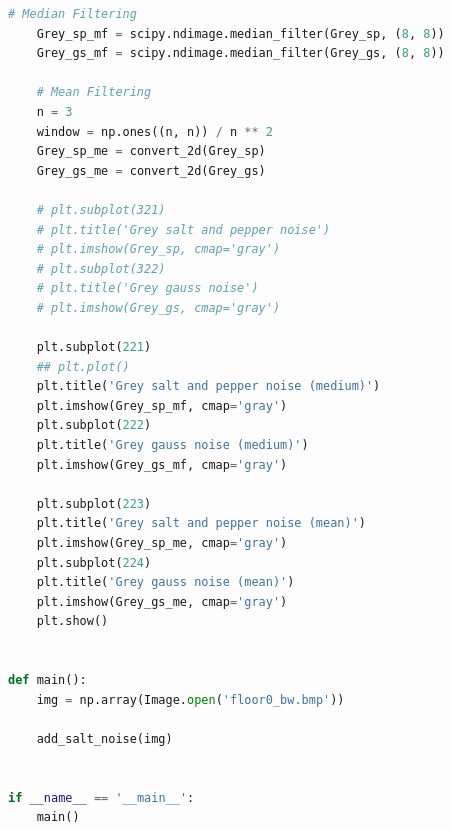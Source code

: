 \documentclass{mcmthesis}
\begin{document}
\begin{lstlisting}[language=Python]
    # Median Filtering
    Grey_sp_mf = scipy.ndimage.median_filter(Grey_sp, (8, 8))
    Grey_gs_mf = scipy.ndimage.median_filter(Grey_gs, (8, 8))

    # Mean Filtering
    n = 3
    window = np.ones((n, n)) / n ** 2
    Grey_sp_me = convert_2d(Grey_sp)
    Grey_gs_me = convert_2d(Grey_gs)

    # plt.subplot(321)
    # plt.title('Grey salt and pepper noise')
    # plt.imshow(Grey_sp, cmap='gray')
    # plt.subplot(322)
    # plt.title('Grey gauss noise')
    # plt.imshow(Grey_gs, cmap='gray')

    plt.subplot(221)
    ## plt.plot()
    plt.title('Grey salt and pepper noise (medium)')
    plt.imshow(Grey_sp_mf, cmap='gray')
    plt.subplot(222)
    plt.title('Grey gauss noise (medium)')
    plt.imshow(Grey_gs_mf, cmap='gray')

    plt.subplot(223)
    plt.title('Grey salt and pepper noise (mean)')
    plt.imshow(Grey_sp_me, cmap='gray')
    plt.subplot(224)
    plt.title('Grey gauss noise (mean)')
    plt.imshow(Grey_gs_me, cmap='gray')
    plt.show()


def main():
    img = np.array(Image.open('floor0_bw.bmp'))

    add_salt_noise(img)


if __name__ == '__main__':
    main()
\end{lstlisting}
\end{document}
